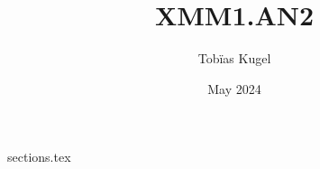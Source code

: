 \documentclass[a4paper, fontsize = 8pt, landscape]{scrartcl}
\title{XMM1.AN2}
\author{Tobïas Kugel}
\date{May 2024}
\begin{document}
\begin{multicols*}{3}
    {sections.tex}
\end{multicols*}
\end{document}
